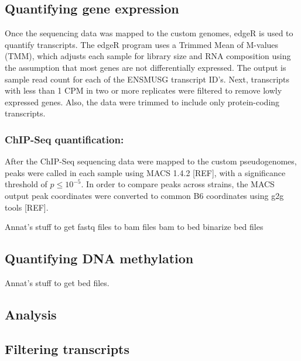\documentclass[10pt,letterpaper]{article}
\begin{document}
\hypertarget{quantifying-gene-expression}{%
\subsection{Quantifying gene
expression}\label{quantifying-gene-expression}}

Once the sequencing data was mapped to the custom genomes, edgeR is used
to quantify transcripts. The edgeR program uses a Trimmed Mean of
M-values (TMM), which adjusts each sample for library size and RNA
composition using the assumption that most genes are not differentially
expressed. The output is sample read count for each of the ENSMUSG
transcript ID's. Next, transcripts with less than 1 CPM in two or more
replicates were filtered to remove lowly expressed genes. Also, the data
were trimmed to include only protein-coding transcripts.

\hypertarget{chip-seq-quantification}{%
\subsubsection{ChIP-Seq quantification:}\label{chip-seq-quantification}}

After the ChIP-Seq sequencing data were mapped to the custom
pseudogenomes, peaks were called in each sample using MACS 1.4.2
{[}REF{]}, with a significance threshold of \(p \leq 10^{-5}\). In order
to compare peaks across strains, the MACS output peak coordinates were
converted to common B6 coordinates using g2g tools {[}REF{]}.

Annat's stuff to get fastq files to bam files bam to bed binarize bed
files

\hypertarget{quantifying-dna-methylation}{%
\subsection{Quantifying DNA
methylation}\label{quantifying-dna-methylation}}

Annat's stuff to get bed files.

\hypertarget{analysis}{%
\subsection{Analysis}\label{analysis}}

\hypertarget{filtering-transcripts}{%
\subsection{Filtering transcripts}\label{filtering-transcripts}}
\end{document}
